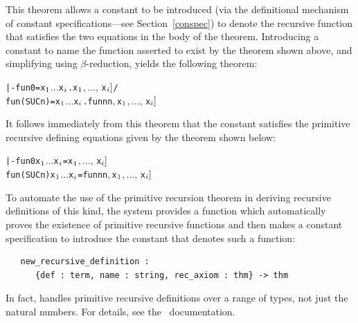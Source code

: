 \noindent This theorem allows a constant  to be introduced (via the
definitional mechanism of constant specifications---see Section~\ref{conspec})
to denote the recursive function that satisfies the two equations in the body
of the theorem. Introducing a constant  to name the function asserted
to exist by the theorem shown above, and simplifying using $\beta$-reduction,
yields the following theorem:

\begin{hol}
\begin{alltt}
   |- fun 0       = \bs{}x\(\sb{1}\) \(\dots\) x\(\sb{i}\).\m{f\sb{1}[}x\(\sb{1}\)\(,\ldots,\,\)x\(\sb{i}]\) /\bs{}
      fun (SUC n) = \bs{}x\(\sb{1}\) \(\dots\) x\(\sb{i}\).\m{f\sb{2}[}fun n  n\(,\) x\(\sb{1}\)\(,\ldots,\,\)x\(\sb{i}]\)
\end{alltt}
\end{hol}

\noindent It follows immediately from this theorem that the constant 
satisfies the primitive recursive defining equations given by the theorem shown
below:

\begin{hol}
\begin{alltt}
   |- fun 0 x\(\sb{1}\) \(\dots\) x\(\sb{i}\) = \m{f\sb{1}[}x\(\sb{1}\)\(,\ldots,\,\)x\(\sb{i}]\)
      fun (SUC n) x\(\sb{1}\) \(\dots\) x\(\sb{i}\) = \m{f\sb{2}[}fun n  n\(,\) x\(\sb{1}\)\(,\ldots,\,\)x\(\sb{i}]\)
\end{alltt}
\end{hol}

To automate the use of the primitive recursion theorem in deriving
recursive definitions of this kind, the \HOL{} system provides a function
which automatically proves the existence of primitive recursive
functions and then makes a constant specification to introduce the constant
that denotes such a function:

\begin{holboxed}
\begin{verbatim}
   new_recursive_definition :
      {def : term, name : string, rec_axiom : thm} -> thm
\end{verbatim}
\end{holboxed}

\noindent In fact,  handles
primitive recursive definitions over a range of types, not just the
natural numbers. For details, see the \REFERENCE\ documentation.

